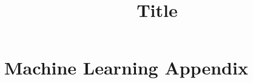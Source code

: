 \documentclass[
fourColumns,
landscape
]{formularyETH/formularyETH}
\title{Title}
\begin{document}




\newpage
{}
\section*{Machine Learning Appendix}\label{sec:ml_appendix}
%
\newpage
{}
%
\newpage


\end{document}

